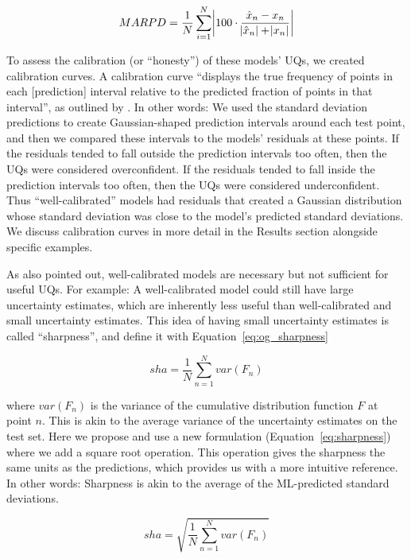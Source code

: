 \documentclass[]{achemso}
\begin{document}
\begin{equation}\label{eq:marpd}
    MARPD = \frac{1}{N} \sum_{i=1}^{N} \abs{100 \cdot \frac{\hat{x}_n - x_n}{\abs{\hat{x}_n} + \abs{x_n}}}
\end{equation}

To assess the calibration (or ``honesty'') of these models' UQs, we created calibration curves. A calibration curve ``displays the true frequency of points in each [prediction] interval relative to the predicted fraction of points in that interval'', as outlined by \citet{Kuleshov2018}.
In other words:  We used the standard deviation predictions to create Gaussian-shaped prediction intervals around each test point, and then we compared these intervals to the models' residuals at these points.
If the residuals tended to fall outside the prediction intervals too often, then the UQs were considered overconfident.
If the residuals tended to fall inside the prediction intervals too often, then the UQs were considered underconfident.
Thus ``well-calibrated'' models had residuals that created a Gaussian distribution whose standard deviation was close to the model's predicted standard deviations.
We discuss calibration curves in more detail in the Results section alongside specific examples.

As \citet{Kuleshov2018} also pointed out, well-calibrated models are necessary but not sufficient for useful UQs.
For example:  A well-calibrated model could still have large uncertainty estimates, which are inherently less useful than well-calibrated and small uncertainty estimates.
This idea of having small uncertainty estimates is called ``sharpness'', and \citet{Kuleshov2018} define it with Equation~\ref{eq:og_sharpness}

\begin{equation}\label{eq:og_sharpness}
    sha = \frac{1}{N} \sum_{n=1}^{N} var(F_n)
\end{equation}

\noindent where $var(F_n)$ is the variance of the cumulative distribution function $F$ at point $n$.
This is akin to the average variance of the uncertainty estimates on the test set.
Here we propose and use a new formulation (Equation~\ref{eq:sharpness}) where we add a square root operation.
This operation gives the sharpness the same units as the predictions, which provides us with a more intuitive reference.
In other words:  Sharpness is akin to the average of the \gls{ML}-predicted standard deviations.

\begin{equation}\label{eq:sharpness}
    sha = \sqrt{\frac{1}{N} \sum_{n=1}^{N} var(F_n)}
\end{equation}
\end{document}
